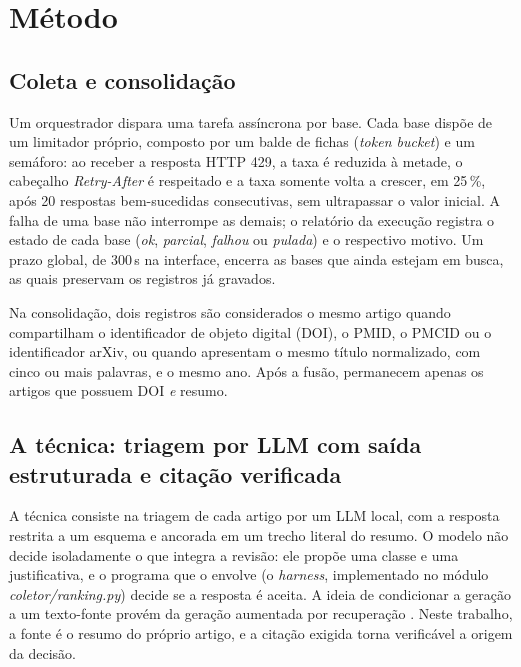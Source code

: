 \documentclass[10pt,a4paper,twocolumn]{article}
\newcommand{\cod}[1]{\textit{#1}}
\begin{document}
\section{Método}

\subsection{Coleta e consolidação}

Um orquestrador dispara uma tarefa assíncrona por base. Cada base dispõe de um limitador próprio, composto por um balde de fichas (\emph{token bucket}) e um semáforo: ao receber a resposta HTTP 429, a taxa é reduzida à metade, o cabeçalho \cod{Retry-After} é respeitado e a taxa somente volta a crescer, em 25\,\%, após 20 respostas bem-sucedidas consecutivas, sem ultrapassar o valor inicial. A falha de uma base não interrompe as demais; o relatório da execução registra o estado de cada base (\cod{ok}, \cod{parcial}, \cod{falhou} ou \cod{pulada}) e o respectivo motivo. Um prazo global, de 300\,s na interface, encerra as bases que ainda estejam em busca, as quais preservam os registros já gravados.

Na consolidação, dois registros são considerados o mesmo artigo quando compartilham o identificador de objeto digital (DOI), o PMID, o PMCID ou o identificador arXiv, ou quando apresentam o mesmo título normalizado, com cinco ou mais palavras, e o mesmo ano. Após a fusão, permanecem apenas os artigos que possuem DOI \emph{e} resumo.

\subsection{A técnica: triagem por LLM com saída estruturada e citação verificada}

A técnica consiste na triagem de cada artigo por um LLM local, com a resposta restrita a um esquema e ancorada em um trecho literal do resumo. O modelo não decide isoladamente o que integra a revisão: ele propõe uma classe e uma justificativa, e o programa que o envolve (o \emph{harness}, implementado no módulo \cod{coletor/ranking.py}) decide se a resposta é aceita. A ideia de condicionar a geração a um texto-fonte provém da geração aumentada por recuperação \cite{rag}. Neste trabalho, a fonte é o resumo do próprio artigo, e a citação exigida torna verificável a origem da decisão.
\end{document}
